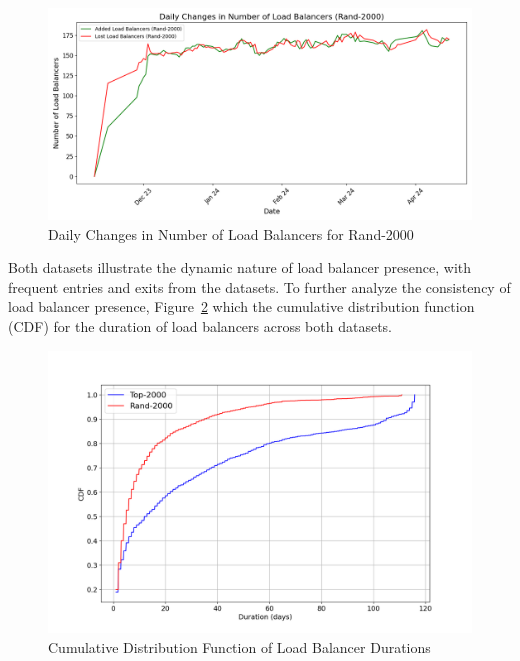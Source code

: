 \documentclass[12pt]{cwru_thesis}
\begin{document}
\begin{figure}[h!]
    \centering
    \includegraphics[width=\linewidth]{figures/load_balancer_changes_Rand-2000.png}
    \caption{Daily Changes in Number of Load Balancers for Rand-2000}
    \label{fig:rand2000_changes}
\end{figure}

Both datasets illustrate the dynamic nature of load balancer presence, with frequent entries and exits from the datasets. To further analyze the consistency of load balancer presence, Figure~\ref{fig:cdf_durations} which the cumulative distribution function (CDF) for the duration of load balancers across both datasets.

\begin{figure}[h!]
    \centering
    \includegraphics[width=\linewidth]{figures/cdf_load_balancer_durations_comparison.png}
    \caption{Cumulative Distribution Function of Load Balancer Durations}
    \label{fig:cdf_durations}
\end{figure}
\end{document}
